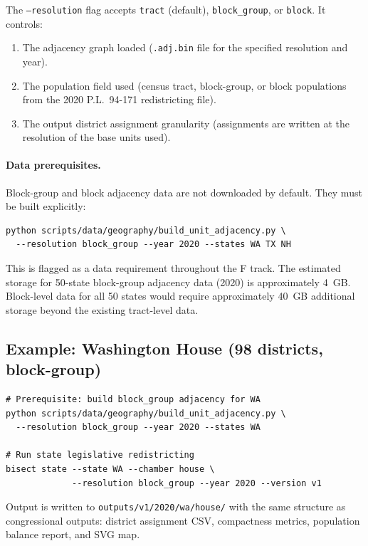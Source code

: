 The \texttt{--resolution} flag accepts \texttt{tract} (default),
\texttt{block\_group}, or \texttt{block}. It controls:
\begin{enumerate}
  \item The adjacency graph loaded (\texttt{.adj.bin} file for the specified
    resolution and year).
  \item The population field used (census tract, block-group, or block populations
    from the 2020 P.L.~94-171 redistricting file).
  \item The output district assignment granularity (assignments are written at
    the resolution of the base units used).
\end{enumerate}

\paragraph{Data prerequisites.}
Block-group and block adjacency data are not downloaded by default.
They must be built explicitly:
\begin{verbatim}
python scripts/data/geography/build_unit_adjacency.py \
  --resolution block_group --year 2020 --states WA TX NH
\end{verbatim}

This is flagged as a data requirement throughout the F track. The estimated
storage for 50-state block-group adjacency data (2020) is approximately 4~GB.
Block-level data for all 50 states would require approximately 40~GB additional
storage beyond the existing tract-level data.

\subsection{Example: Washington House (98 districts, block-group)}
\label{sec:cli:example}

\begin{verbatim}
# Prerequisite: build block_group adjacency for WA
python scripts/data/geography/build_unit_adjacency.py \
  --resolution block_group --year 2020 --states WA

# Run state legislative redistricting
bisect state --state WA --chamber house \
             --resolution block_group --year 2020 --version v1
\end{verbatim}

Output is written to \texttt{outputs/v1/2020/wa/house/} with the same
structure as congressional outputs: district assignment CSV, compactness metrics,
population balance report, and SVG map.

